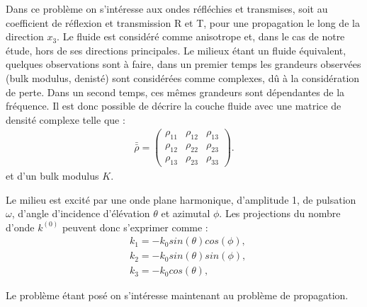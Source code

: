 \documentclass[12pt]{report}
\begin{document}
    Dans ce problème on s'intéresse aux ondes réfléchies et transmises, soit au coefficient de réflexion et transmission R et T, pour une propagation le long de la direction $x_3$.
    Le fluide est considéré comme anisotrope et, dans le cas de notre étude, hors de ses directions principales. Le milieux étant un fluide équivalent, quelques observations sont à faire, dans un premier temps les grandeurs observées (bulk modulus, denisté) sont considérées comme complexes, dû à la considération de perte. Dans un second temps, ces mêmes grandeurs sont dépendantes de la fréquence.
    Il est donc possible de décrire la couche fluide avec une matrice de densité complexe telle que :
    \begin{align}
    \bar{\bar{\rho}}=\begin{pmatrix}
    					\rho_{11} & \rho_{12} & \rho_{13} \\
                        \rho_{12} & \rho_{22} & \rho_{23} \\
                        \rho_{13} & \rho_{23} & \rho_{33}                       
    				 \end{pmatrix}.
    \end{align}
    et d'un bulk modulus $K$.
    
    Le milieu est excité par une onde plane harmonique, d'amplitude 1, de pulsation $\omega$, d'angle d'incidence d'élévation $\theta$ et azimutal $\phi$. Les projections du nombre d'onde $k^{(0)}$ peuvent donc s'exprimer comme : 
    \begin{align}
    &k_1=-k_0 sin(\theta) cos(\phi),\label{k1} \\
    &k_2=-k_0 sin(\theta) sin(\phi),\label{k2} \\
    &k_3= -k_0 cos(\theta),\label{k3}
    \end{align}
        
        Le problème étant posé on s'intéresse maintenant au problème de propagation.
        
\end{document}
